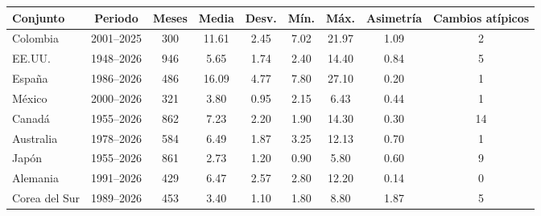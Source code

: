 \begin{tabular}{lcccccccc}
\toprule
Conjunto & Periodo & Meses & Media & Desv. & Mín. & Máx. & Asimetría & Cambios atípicos \\
\midrule
Colombia & 2001--2025 & 300 & 11.61 & 2.45 & 7.02 & 21.97 & 1.09 & 2 \\
EE.UU. & 1948--2026 & 946 & 5.65 & 1.74 & 2.40 & 14.40 & 0.84 & 5 \\
España & 1986--2026 & 486 & 16.09 & 4.77 & 7.80 & 27.10 & 0.20 & 1 \\
México & 2000--2026 & 321 & 3.80 & 0.95 & 2.15 & 6.43 & 0.44 & 1 \\
Canadá & 1955--2026 & 862 & 7.23 & 2.20 & 1.90 & 14.30 & 0.30 & 14 \\
Australia & 1978--2026 & 584 & 6.49 & 1.87 & 3.25 & 12.13 & 0.70 & 1 \\
Japón & 1955--2026 & 861 & 2.73 & 1.20 & 0.90 & 5.80 & 0.60 & 9 \\
Alemania & 1991--2026 & 429 & 6.47 & 2.57 & 2.80 & 12.20 & 0.14 & 0 \\
Corea del Sur & 1989--2026 & 453 & 3.40 & 1.10 & 1.80 & 8.80 & 1.87 & 5 \\
\bottomrule
\end{tabular}